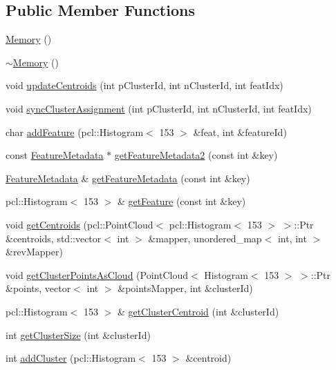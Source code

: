 \subsection*{Public Member Functions}
\begin{DoxyCompactItemize}
\item 
\hyperlink{class_memory_a585d7bb6fc6f2237bcebf94a86b7dd99}{Memory} ()
\item 
\hyperlink{class_memory_a0ffa9759ebbf103f11132a505b93bdc0}{$\sim$\+Memory} ()
\item 
void \hyperlink{class_memory_a81ed8055b93c8e1e050d0e5f62f8a354}{update\+Centroids} (int p\+Cluster\+Id, int n\+Cluster\+Id, int feat\+Idx)
\item 
void \hyperlink{class_memory_af9c379b0907b97bc242c46bda5d58c4e}{sync\+Cluster\+Assignment} (int p\+Cluster\+Id, int n\+Cluster\+Id, int feat\+Idx)
\item 
char \hyperlink{class_memory_a02592896aaa8a91632b5c959b0a5df4c}{add\+Feature} (pcl\+::\+Histogram$<$ 153 $>$ \&feat, int \&feature\+Id)
\item 
const \hyperlink{class_feature_metadata}{Feature\+Metadata} $\ast$ \hyperlink{class_memory_ac57d713e84dce226545c1bd13007084b}{get\+Feature\+Metadata2} (const int \&key)
\item 
\hyperlink{class_feature_metadata}{Feature\+Metadata} \& \hyperlink{class_memory_a31661ea1c1d5a5fd22c0168541e82e3a}{get\+Feature\+Metadata} (const int \&key)
\item 
pcl\+::\+Histogram$<$ 153 $>$ \& \hyperlink{class_memory_abdfd86649f7e608ae6ea6af54e192fe6}{get\+Feature} (const int \&key)
\item 
void \hyperlink{class_memory_a6ba49963ea1576312687d17d8976285c}{get\+Centroids} (pcl\+::\+Point\+Cloud$<$ pcl\+::\+Histogram$<$ 153 $>$ $>$\+::Ptr \&centroids, std\+::vector$<$ int $>$ \&mapper, unordered\+\_\+map$<$ int, int $>$ \&rev\+Mapper)
\item 
void \hyperlink{class_memory_a34e8ddd680ea3a878d7564bedc8bb220}{get\+Cluster\+Points\+As\+Cloud} (Point\+Cloud$<$ Histogram$<$ 153 $>$ $>$\+::Ptr \&points, vector$<$ int $>$ \&points\+Mapper, int \&cluster\+Id)
\item 
pcl\+::\+Histogram$<$ 153 $>$ \& \hyperlink{class_memory_a56f9018e4eb1b2be429cc49b062263db}{get\+Cluster\+Centroid} (int \&cluster\+Id)
\item 
int \hyperlink{class_memory_af9c8b5c59df8b4d7ba77d08b90828d96}{get\+Cluster\+Size} (int \&cluster\+Id)
\item 
int \hyperlink{class_memory_ab71403837c0335a0e96a1e4814d4beb6}{add\+Cluster} (pcl\+::\+Histogram$<$ 153 $>$ \&centroid)

\end{DoxyCompactItemize}
